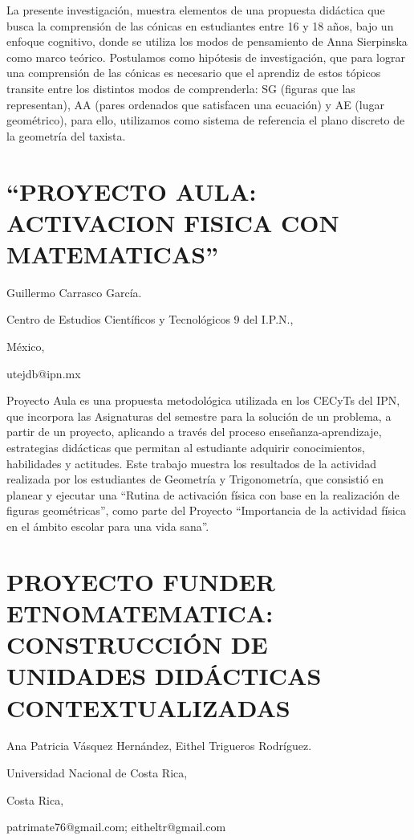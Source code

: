 La presente investigación, muestra elementos de una propuesta didáctica
que busca la comprensión de las cónicas en estudiantes entre 16 y
18 años, bajo un enfoque cognitivo, donde se utiliza los modos de
pensamiento de Anna Sierpinska como marco teórico. Postulamos como
hipótesis de investigación, que para lograr una comprensión de las
cónicas es necesario que el aprendiz de estos tópicos transite entre
los distintos modos de comprenderla: SG (figuras que las representan),
AA (pares ordenados que satisfacen una ecuación) y AE (lugar geométrico),
para ello, utilizamos como sistema de referencia el plano discreto
de la geometría del taxista. 


\section{“PROYECTO AULA: ACTIVACION FISICA CON MATEMATICAS” }

\begin{datos}

Guillermo Carrasco García.

Centro de Estudios Científicos y Tecnológicos 9 del I.P.N.,

México,

utejdb@ipn.mx

\end{datos}

Proyecto Aula es una propuesta metodológica utilizada en los CECyTs
del IPN, que incorpora las Asignaturas del semestre para la solución
de un problema, a partir de un proyecto, aplicando a través del proceso
enseñanza-aprendizaje, estrategias didácticas que permitan al estudiante
adquirir conocimientos, habilidades y actitudes. Este trabajo muestra
los resultados de la actividad realizada por los estudiantes de Geometría
y Trigonometría, que consistió en planear y ejecutar una “Rutina de
activación física con base en la realización de figuras geométricas”,
como parte del Proyecto “Importancia de la actividad física en el
ámbito escolar para una vida sana”.


\section{PROYECTO FUNDER ETNOMATEMATICA: CONSTRUCCIÓN DE UNIDADES DIDÁCTICAS
CONTEXTUALIZADAS}

\begin{datos}

Ana Patricia Vásquez Hernández, Eithel Trigueros Rodríguez.

Universidad Nacional de Costa Rica,

Costa Rica,

patrimate76@gmail.com; eitheltr@gmail.com 

\end{datos}

